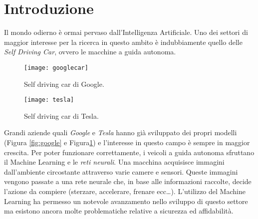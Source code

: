 \chapter*{Introduzione}
Il mondo odierno è ormai pervaso dall'Intelligenza Artificiale. Uno dei settori di maggior interesse per la
ricerca in questo ambito è indubbiamente quello delle \emph{Self Driving Car}, ovvero
le macchine a guida autonoma. 
\begin{figure}
  \centering
  \parbox{5cm}{
  \texttt{[image: googlecar]}
  \caption{Self driving car di Google.}
  \label{fig:google}}
  \qquad
  \begin{minipage}{5cm}
  \texttt{[image: tesla]}
  \caption{Self driving car di Tesla.}
  \label{fig:tesla}
  \end{minipage}
  \end{figure}
Grandi aziende quali \emph{Google} e \emph{Tesla} hanno già sviluppato
dei propri modelli  (Figura \ref{fig:google} e Figura\ref{fig:tesla}) e l'interesse in questo campo è sempre in  maggior crescita. Per poter funzionare correttamente, i veicoli a guida autonoma sfruttano il Machine Learning e le \emph{reti neurali}. Una macchina acquisisce immagini
dall'ambiente circostante attraverso varie camere e sensori. Queste immagini vengono passate a una rete neurale che, in base alle informazioni raccolte, decide l'azione da compiere (sterzare, accelerare, frenare ecc\dots).
L'utilizzo del Machine Learning ha permesso un notevole avanzamento nello sviluppo di questo settore ma  esistono ancora molte problematiche relative a sicurezza ed affidabilità.\\

